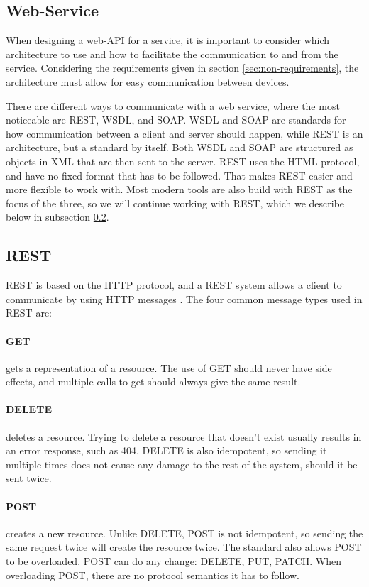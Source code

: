 \subsection{Web-Service}
When designing a web-API for a service, it is important to consider which architecture to use and how to facilitate the communication to and from the service. Considering the requirements given in section \ref{sec:non-requirements}, the architecture must allow for easy communication between devices.

There are different ways to communicate with a web service, where the most noticeable are REST, WSDL, and SOAP. WSDL and SOAP are standards for how communication between a client and server should happen, while REST is an architecture, but a standard by itself.
Both WSDL and SOAP are structured as objects in XML that are then sent to the server. REST uses the HTML protocol, and have no fixed format that has to be followed. That makes REST easier and more flexible to work with. Most modern tools are also build with REST as the focus of the three, so we will continue working with REST, which we describe below in subsection \ref{rest}.


\subsection{REST} \label{rest}
REST is based on the HTTP protocol, and a REST system allows a client to communicate by using HTTP messages \cite{restapitutorial}\cite{restwikipedia}.
The four common message types used in REST are:

\paragraph{GET} gets a representation of a resource. The use of GET should never have side effects, and multiple calls to get should always give the same result.
\paragraph{DELETE} deletes a resource. Trying to delete a resource that doesn't exist usually results in an error response, such as 404. DELETE is also idempotent, so sending it multiple times does not cause any damage to the rest of the system, should it be sent twice.
\paragraph{POST} creates a new resource. Unlike DELETE, POST is not idempotent, so sending the same request twice will create the resource twice. 
The standard also allows POST to be overloaded. POST can do any change: DELETE, PUT, PATCH. When overloading POST, there are no protocol semantics it has to follow.
